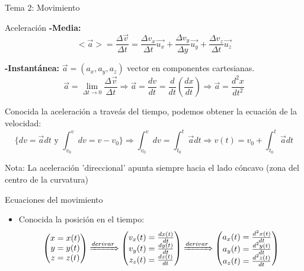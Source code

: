\documentclass[10pt, letterpaper]{article}
\newcommand{\negrita}[1]{\textbf{#1}}
\newcommand{\integral}[2]{\int_{#1}^{#2}}
\newcommand{\limite}[2]{\lim_{#1 \to #2} }
\begin{document}
\begin{section}{Tema 2: Movimiento}
    \begin{subsection}{Aceleración}
        \negrita{-Media:} 
                    \[<\vec{a}> = \frac{\Delta \vec{v}}{\Delta t} = \frac{\Delta v_x}{\Delta t}\vec{u_x}+\frac{\Delta v_y}{\Delta y}\vec{u_y}+\frac{\Delta v_z}{\Delta t}\vec{u_z}\]

                \negrita{-Instantánea:} $\vec{a} = \left(a_x, a_y, a_z\right)$ vector en componentes cartesianas.
                    \[\vec{a} = \limite{\Delta t}{0} \frac{\Delta \vec{v}}{\Delta t} \Rightarrow \vec{a} =  \frac{dv}{dt} = \frac{d}{dt}\left(\frac{dx}{dt}\right) \Rightarrow \vec{a} = \frac{d^2 x}{dt^2}\]

                Conocida la aceleración a traveás del tiempo, podemos obtener la ecuación de la velocidad:
                    \[ \{dv = \vec{a} dt \text{ y } \integral{v_0}{v}dv = v-v_0 \} \Longrightarrow \integral{v_0}{v} dv = \integral{t_0}{t} \vec{a} dt \Rightarrow v(t) = v_0 + \integral{t_0}{t} \vec{a}dt \]

                Nota: La aceleración 'direccional' apunta siempre hacia el lado cóncavo (zona del centro de la curvatura)
    \end{subsection}

    \begin{subsection}{Ecuaciones del movimiento}
        \begin{itemize}
            \item Conocida la posición en el tiempo:
                \[\begin{pmatrix}
                    x=x(t)\\
                    y = y(t)\\
                    z = z(t)
                \end{pmatrix} 
                \xRightarrow[]{derivar}
                \begin{pmatrix}
                    v_x(t) = \frac{dx(t)}{dt}\\
                    v_y(t) =\frac{dy(t)}{dt}\\
                    z_z(t) = \frac{dz(t)}{dt}
                \end{pmatrix}
                \xRightarrow[]{derivar}
                \begin{pmatrix}
                    a_x(t) = \frac{d^2 x(t)}{dt}\\
                    a_y(t) = \frac{d^2y(t)}{dt}\\
                    a_z(t) = \frac{d^2z(t)}{dt}
                \end{pmatrix}\]


\end{itemize}
\end{subsection}
\end{section}
\end{document}
